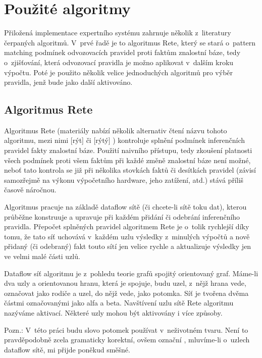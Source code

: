\section{Použité algoritmy}
Přiložená implementace expertního systému zahrnuje několik z~literatury
čerpaných algoritmů. V~prvé řadě je to algoritmus Rete, který se stará o~pattern
matching podmínek odvozovacích pravidel proti faktům znalostní báze, tedy
o~zjišťování, která odvozovací pravidla je možno aplikovat v~dalším kroku výpočtu.
Poté je použito několik velice jednoduchých algoritmů pro výběr pravidla, jenž
bude jako další aktivováno.
\subsection{Algoritmus Rete}
Algoritmus Rete (materiály nabízí několik alternativ čtení názvu tohoto algoritmu,
mezi nimi  [rýt] či  [rýtý] \cite{doorenbos}) kontroluje
splnění podmínek inferenčních pravidel fakty znalostní báze. Použití naivního
přístupu, tedy zkoušení platnosti všech podmínek proti všem faktům při každé
změně znalostní báze není možné, neboť tato kontrola se již při několika stovkách
faktů či desítkách pravidel (závisí samozřejmě na výkonu výpočetního hardware, jeho
zatížení, atd.) stává příliš časově náročnou.

Algoritmus pracuje na základě dataflow sítě (či chcete-li sítě toku dat),
kterou průběžne konstruuje a upravuje při každém přidání či odebrání
inferenčního pravidla. Přepočet splněných pravidel algoritmem Rete je o~tolik
rychlejší díky tomu, že tato síť uchovává v~každém uzlu výsledky z~minulých
výpočtů a nově přidaný (či odebraný) fakt touto sítí jen velice rychle
 a aktualizuje výsledky jen ve velmi malé části uzlů.

Dataflow síť algoritmu je z~pohledu teorie grafů spojitý orientovaný graf.
Máme-li dva uzly a orientovanou hranu, která je spojuje, budu uzel, z~nějž
hrana vede, označovat jako rodiče a uzel, do nějž vede, jako potomka.
Síť je tvořena dvěma částmi označovanými jako alfa a beta. Navštívení uzlu
sítě Rete algoritmu nazýváme aktivací. Některé uzly mohou být aktivovány
i více způsoby.

Pozn.: V~této práci budu slovo potomek používat v~neživotném tvaru. Není to
pravděpodobně zcela gramaticky korektní, ovšem označní ,
mluvíme-li o~uzlech dataflow sítě, mi přijde poněkud směšné.

